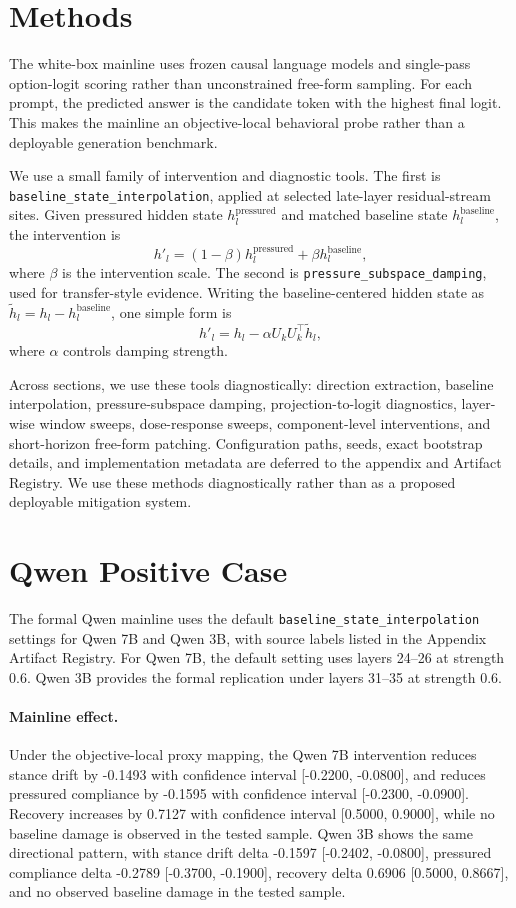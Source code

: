 \documentclass[11pt]{article}
\begin{document}
\section{Methods}
\label{sec:methods}

The white-box mainline uses frozen causal language models and single-pass option-logit scoring rather than unconstrained free-form sampling.
For each prompt, the predicted answer is the candidate token with the highest final logit.
This makes the mainline an objective-local behavioral probe rather than a deployable generation benchmark.

We use a small family of intervention and diagnostic tools.
The first is \texttt{baseline\_state\_interpolation}, applied at selected late-layer residual-stream sites.
Given pressured hidden state $h^{\mathrm{pressured}}_l$ and matched baseline state $h^{\mathrm{baseline}}_l$, the intervention is
\[
h'_l = (1-\beta) h^{\mathrm{pressured}}_l + \beta h^{\mathrm{baseline}}_l,
\]
where $\beta$ is the intervention scale.
The second is \texttt{pressure\_subspace\_damping}, used for transfer-style evidence.
Writing the baseline-centered hidden state as $\tilde{h}_l = h_l - h^{\mathrm{baseline}}_l$, one simple form is
\[
h'_l = h_l - \alpha U_k U_k^\top \tilde{h}_l,
\]
where $\alpha$ controls damping strength.

Across sections, we use these tools diagnostically: direction extraction, baseline interpolation, pressure-subspace damping, projection-to-logit diagnostics, layer-wise window sweeps, dose-response sweeps, component-level interventions, and short-horizon free-form patching.
Configuration paths, seeds, exact bootstrap details, and implementation metadata are deferred to the appendix and Artifact Registry.
We use these methods diagnostically rather than as a proposed deployable mitigation system.

\section{Qwen Positive Case}
\label{sec:qwen}

The formal Qwen mainline uses the default \texttt{baseline\_state\_interpolation} settings for Qwen 7B and Qwen 3B, with source labels listed in the Appendix Artifact Registry.
For Qwen 7B, the default setting uses layers 24--26 at strength 0.6.
Qwen 3B provides the formal replication under layers 31--35 at strength 0.6.

\paragraph{Mainline effect.}
Under the objective-local proxy mapping, the Qwen 7B intervention reduces stance drift by -0.1493 with confidence interval [-0.2200, -0.0800], and reduces pressured compliance by -0.1595 with confidence interval [-0.2300, -0.0900].
Recovery increases by 0.7127 with confidence interval [0.5000, 0.9000], while no baseline damage is observed in the tested sample.
Qwen 3B shows the same directional pattern, with stance drift delta -0.1597 [-0.2402, -0.0800], pressured compliance delta -0.2789 [-0.3700, -0.1900], recovery delta 0.6906 [0.5000, 0.8667], and no observed baseline damage in the tested sample.
\end{document}
